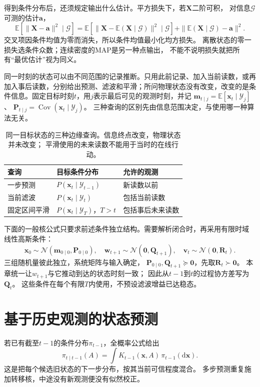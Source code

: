得到条件分布后，还须规定输出什么估计。平方损失下，若$\bm X$二阶可积，
对信息$\mathcal G$可测的估计$\bm a$，
\[
 \mathbb E[\|\bm X-\bm a\|^2\mid\mathcal G]
 =\mathbb E[\|\bm X-\mathbb E(\bm X\mid\mathcal G)\|^2\mid\mathcal G]
       +\|\mathbb E(\bm X\mid\mathcal G)-\bm a\|^2.
\]
交叉项因条件均值为零而消失，所以条件均值最小化均方损失。
离散状态的零一损失选条件众数；连续密度的MAP是另一种点输出，
不能不说明损失就把所有“最优估计”视为同义。

\label{sec:dynamical-kalman-rts}

同一时刻的状态可以由不同范围的记录推断。只用此前记录、加入当前读数，或再加入事后读数，分别给出预测、滤波和平滑；所问物理状态没有改变，改变的是条件信息。固定目标时刻$t$，用$j$表示最后可见的观测时刻，并记
$\bm m_{t\mid j}=\mathbb E[\bm x_t\mid\mathcal Y_j]$、
$\bm P_{t\mid j}=\operatorname{Cov}(\bm x_t\mid\mathcal Y_j)$。
三种查询的区别先由信息范围决定，与使用哪一种算法无关。

\begin{table}[htbp]
 \centering
 \begin{tabularx}{\linewidth}{lXX}
 \toprule
 查询 & 目标条件分布 & 允许的观测\\
 \midrule
 一步预测 & $P(\bm x_t\mid\mathcal Y_{t-1})$ & 新读数以前\\
 当前滤波 & $P(\bm x_t\mid\mathcal Y_t)$ & 包括当前读数\\
 固定区间平滑 & $P(\bm x_t\mid\mathcal Y_T)$，$T>t$ & 包括事后未来读数\\
 \bottomrule
 \end{tabularx}
 \caption{同一目标状态的三种边缘查询。信息终点改变，物理状态并未改变；
 平滑使用的未来读数不能用于当时的在线行动。}
 \label{tab:dynamical-estimation-information}
\end{table}

下面的一般核公式只要求前述条件独立结构。需要解析闭合时，再采用有限时域
线性高斯条件：
\[
 \bm x_0\sim\mathcal N(\bm m_{0\mid0},\bm P_{0\mid0}),\quad
 \bm w_{t+1}\sim\mathcal N(\bm0,\bm Q_{t+1}),\quad
 \bm v_t\sim\mathcal N(\bm0,\bm R_t).
\]
三组随机量彼此独立，系统矩阵与输入确定，
$\bm P_{0\mid0},\bm Q_{t+1}\succeq\bm0$，先取$\bm R_t\succ\bm0$。
本章统一让$w_{t+1}$与它推动到达的状态时刻一致；
因此从$t-1$到$t$的过程协方差写为$\bm Q_t$。
这些条件在每个有限$T$内使用，不预设滤波增益已达稳态。

\section{基于历史观测的状态预测}
若已有截至$t-1$的条件分布$\pi_{t-1}$，全概率公式给出
\begin{equation}
 \pi_{t\mid t-1}(A)
     =\int K_{t-1}(\bm x,A)\,\pi_{t-1}(\mathrm d\bm x).
 \label{eq:dynamical-general-prediction-kernel}
\end{equation}
这是把每个候选旧状态的下一步分布，按其当前可信程度混合。
多步预测重复施加转移核，中途没有新观测便没有似然校正。

